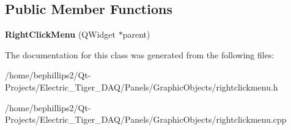 \subsection*{Public Member Functions}
\begin{DoxyCompactItemize}
\item 
{\bfseries Right\+Click\+Menu} (Q\+Widget $\ast$parent)\hypertarget{class_right_click_menu_afa4f52467f82c6d5de54999ba037428f}{}\label{class_right_click_menu_afa4f52467f82c6d5de54999ba037428f}

\end{DoxyCompactItemize}


The documentation for this class was generated from the following files\+:\begin{DoxyCompactItemize}
\item 
/home/bephillips2/\+Qt-\/\+Projects/\+Electric\+\_\+\+Tiger\+\_\+\+D\+A\+Q/\+Panels/\+Graphic\+Objects/rightclickmenu.\+h\item 
/home/bephillips2/\+Qt-\/\+Projects/\+Electric\+\_\+\+Tiger\+\_\+\+D\+A\+Q/\+Panels/\+Graphic\+Objects/rightclickmenu.\+cpp\end{DoxyCompactItemize}
